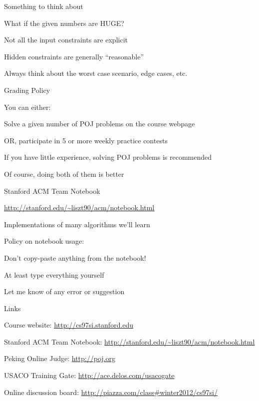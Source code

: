 \documentclass[10pt,onlymath]{beamer}
\begin{document}
\begin{frame} {Something to think about}
\BIT
\item What if the given numbers are HUGE?

\item Not all the input constraints are explicit
\BIT \item Hidden constraints are generally ``reasonable'' \EIT

\item Always think about the worst case scenario, edge cases, etc.
\EIT
\end{frame}

\begin{frame} {Grading Policy}
\BIT
\item You can either:
\BIT
\item Solve a given number of POJ problems on the course webpage
\item OR, participate in 5 or more weekly practice contests
\EIT

\item If you have little experience, solving POJ problems is recommended
\BIT
\item Of course, doing both of them is better
\EIT
\EIT
\end{frame}

\begin{frame} {Stanford ACM Team Notebook}
\BIT
\item \url{http://stanford.edu/~liszt90/acm/notebook.html}
\item Implementations of many algorithms we'll learn
\item Policy on notebook usage:
\BIT
\item Don't copy-paste anything from the notebook!
\item At least type everything yourself
\item Let me know of any error or suggestion
\EIT
\EIT
\end{frame}

\begin{frame}[fragile] {Links}
\BIT
\item Course website: \url{http://cs97si.stanford.edu}
\item Stanford ACM Team Notebook: \url{http://stanford.edu/~liszt90/acm/notebook.html}
\item Peking Online Judge: \url{http://poj.org}
\item USACO Training Gate: \url{http://ace.delos.com/usacogate}
\item Online discussion board: \url{http://piazza.com/class#winter2012/cs97si/}
\EIT
\end{frame}
\end{document}

